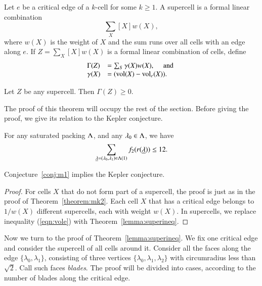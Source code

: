\begin{definition}
Let $e$ be a critical edge of a $k$-cell for some $k\ge 1$.
A supercell is a formal linear combination
$$
\sum_X [X] w(X),
$$
where $w(X)$ is the weight of $X$ and the sum runs over all cells with an edge along $e$.  If $Z = \sum_X [X] w(X)$ is a formal linear combination of cells, define
$$
\begin{array}{lll}
\Gamma(Z) &= \sum_S \gamma(X) w(X),\quad\hbox{ and }\\
\gamma(X) &=  ({\operatorname{vol}}(X)-{\operatorname{vol}}_e(X)).
\end{array}
$$

\end{definition}

\begin{theorem}\label{lemma:superineq} 
Let $Z$ be any supercell.  Then $\Gamma(Z)\ge 0$.
\end{theorem}

The proof of this theorem will occupy the rest of the section.  Before giving the proof, we give its relation to the Kepler conjecture.


\begin{conjecture}\label{conj:m2} For any saturated packing $\Lambda$, and
any $\lambda_0\in\Lambda$, we have
\begin{equation}\label{eqn:f12}
\sum_{{\underline{\lambda}}=(\lambda_0,\lambda_1)\in\Lambda(1)} f_2(r({\underline{\lambda}})) \le 12.
\end{equation}
\end{conjecture}

\begin{theorem}\label{theorem:mk2}
Conjecture~\ref{conj:m1} implies the Kepler conjecture.
\end{theorem}

\begin{proof}  For cells $X$ that do not form part of a supercell,
the proof is just as in the proof of Theorem~\ref{theorem:mk2}.
Each cell $X$ that has a critical edge belongs to $1/w(X)$ different
supercells, each with weight $w(X)$.  In supercells, we replace inequality
(\ref{eqn:vole}) with Theorem~\ref{lemma:superineq}.
\end{proof}

Now we turn to the proof of Theorem~\ref{lemma:superineq}.
We fix one critical edge and consider the supercell of all cells around it.  Consider all the faces along the edge $\{\lambda_0,\lambda_1\}$, consisting of three vertices $\{\lambda_0,\lambda_1,\lambda_2\}$ with circumradius less than $\sqrt2$.  Call such faces {\it blades}.  The proof will be divided into cases, according to the number of blades along the critical edge.

